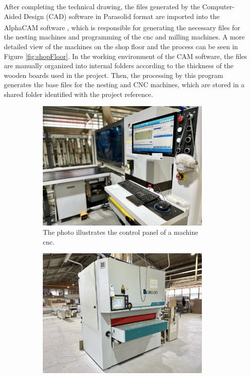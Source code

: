 After completing the technical drawing, the files generated by the Computer-Aided Design (CAD) software in Parasolid format are imported into the AlphaCAM\textsuperscript{\textregistered} software \cite{alphacam}, which is responsible for generating the necessary files for the nesting machines and programming of the \acrfull{cnc} and milling machines. A more detailed view of the machines on the shop floor and the process can be seen in Figure \ref{fig:shopFloor}. In the working environment of the CAM software, the files are manually organized into internal folders according to the thickness of the wooden boards used in the project. Then, the processing by this program generates the base files for the nesting and CNC machines, which are stored in a shared folder identified with the project reference. 

\begin{figure}[!ht]
     \centering
     \begin{subfigure}[b]{0.32\linewidth}
         \centering
         \includegraphics[width=0.95\textwidth]{images/Development/chap4/machine01.jpg}
         \caption{The photo illustrates the control panel of a machine \acrshort{cnc}.}
         \label{fig:machine01}
     \end{subfigure}
     \hfill
     \begin{subfigure}[b]{0.32\linewidth}
         \centering
         \includegraphics[width=0.95\textwidth]{images/Development/chap4/machine02.jpg}

\end{subfigure}
\end{figure}
